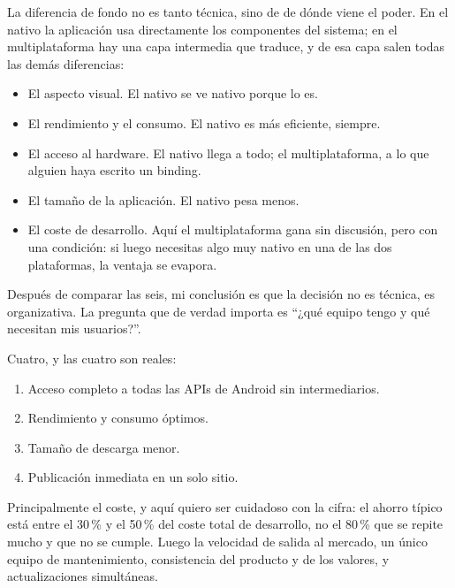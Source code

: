 La diferencia de fondo no es tanto técnica, sino de de dónde viene el poder. En el nativo la aplicación usa directamente los componentes del sistema; en el multiplataforma hay una capa intermedia que traduce, y de esa capa salen todas las demás diferencias:
\begin{itemize}[leftmargin=*,itemsep=0.2em,topsep=0.2em]
  \item El aspecto visual. El nativo se ve nativo porque lo es.
  \item El rendimiento y el consumo. El nativo es más eficiente, siempre.
  \item El acceso al hardware. El nativo llega a todo; el multiplataforma, a lo que alguien haya escrito un binding.
  \item El tamaño de la aplicación. El nativo pesa menos.
  \item El coste de desarrollo. Aquí el multiplataforma gana sin discusión, pero con una condición: si luego necesitas algo muy nativo en una de las dos plataformas, la ventaja se evapora.
\end{itemize}

Después de comparar las seis, mi conclusión es que la decisión no es técnica, es organizativa. La pregunta que de verdad importa es \enquote{¿qué equipo tengo y qué necesitan mis usuarios?}.


Cuatro, y las cuatro son reales:
\begin{enumerate}[leftmargin=*,itemsep=0.1em]
  \item Acceso completo a todas las APIs de Android sin intermediarios.
  \item Rendimiento y consumo óptimos.
  \item Tamaño de descarga menor.
  \item Publicación inmediata en un solo sitio.
\end{enumerate}


 Principalmente el coste, y aquí quiero ser cuidadoso con la cifra: el ahorro típico está entre el 30\,\% y el 50\,\% del coste total de desarrollo, no el 80\,\% que se repite mucho y que no se cumple. Luego la velocidad de salida al mercado, un único equipo de mantenimiento, consistencia del producto y de los valores, y actualizaciones simultáneas.

